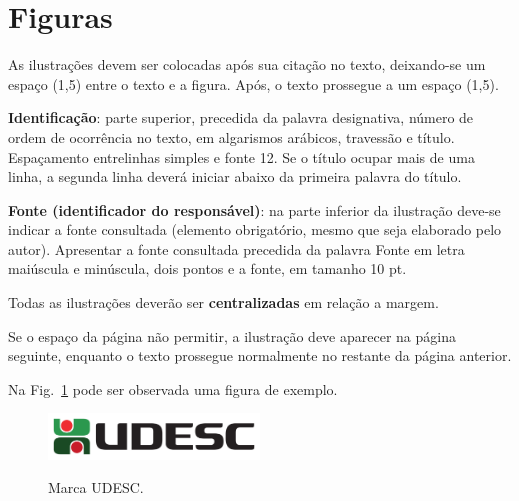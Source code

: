 \section{Figuras}

As ilustrações devem ser colocadas após sua citação no texto, deixando-se um espaço
(1,5) entre o texto e a figura. Após, o texto prossegue a um espaço (1,5).

\textbf{Identificação}: parte superior, precedida da palavra designativa, número de ordem de
ocorrência no texto, em algarismos arábicos, travessão e título. Espaçamento
entrelinhas simples e fonte 12. Se o título ocupar mais de uma linha, a segunda linha
deverá iniciar abaixo da primeira palavra do título.

\textbf{Fonte (identificador do responsável)}: na parte inferior da ilustração deve-se indicar a
fonte consultada (elemento obrigatório, mesmo que seja elaborado pelo autor).
Apresentar a fonte consultada precedida da palavra Fonte em letra maiúscula e
minúscula, dois pontos e a fonte, em tamanho 10 pt.

Todas as ilustrações deverão ser \textbf{centralizadas} em relação a margem.

Se o espaço da página não permitir, a ilustração deve aparecer na página seguinte,
enquanto o texto prossegue normalmente no restante da página anterior.

Na Fig.~\ref{fig:marca_udesc_01} pode ser observada uma figura de exemplo.

\begin{figure}[!htbp]
	\centering	
 	\caption{Marca UDESC.}
	\includegraphics[width=0.5\textwidth]{cor_horizontal_pdf.pdf}
	\label{fig:marca_udesc_01}
\end{figure}

